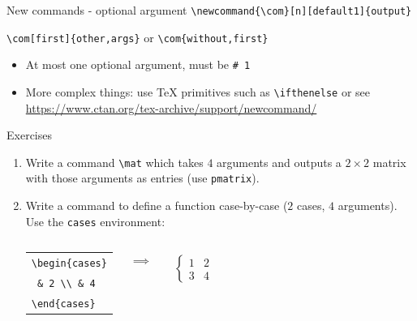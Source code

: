 \documentclass[11pt]{beamer}
\newcommand{\bs}{\textbackslash}
\begin{document}
\begin{frame}{New commands - optional argument}
  \texttt{\bs newcommand\{\bs com\}[n][default1]\{output\}}

  \texttt{\bs com[first]\{other,args\}} or \texttt{\bs com\{without,first\}}

  \vspace{1cm}
  \begin{itemize}
    \item At most one optional argument, must be \texttt{\# 1}

    \vspace{0.3cm}
    \item More complex things: use TeX primitives such as
          \texttt{\bs ifthenelse} or see
          \url{https://www.ctan.org/tex-archive/support/newcommand/}
  \end{itemize}
\end{frame}

\begin{frame}{Exercises}
  \begin{enumerate}%
    \item Write a command \texttt{\bs mat} which takes $4$ arguments and
          outputs a $2\times 2$ matrix with those arguments as entries
          (use \texttt{pmatrix}).

    \vspace{0.5cm}
    \item Write a command to define a function case-by-case ($2$ cases,
          $4$ arguments). Use the \texttt{cases} environment:

          \vspace{0.2cm}
          \begin{columns}
            \begin{center}\begin{tabular}{l}
              \texttt{\bs begin\{cases\}} \\
              \texttt{\quad 1 \& 2 \bs\bs \quad3 \& 4} \\
              \texttt{\bs end\{cases\}}
            \end{tabular}\end{center}

              \begin{center} $\implies$ \end{center}

            \begin{align*}
              \begin{cases} 1 & 2 \\ 3 & 4 \end{cases}
            \end{align*}
          \end{columns}
  \end{enumerate}
\end{frame}
\end{document}
